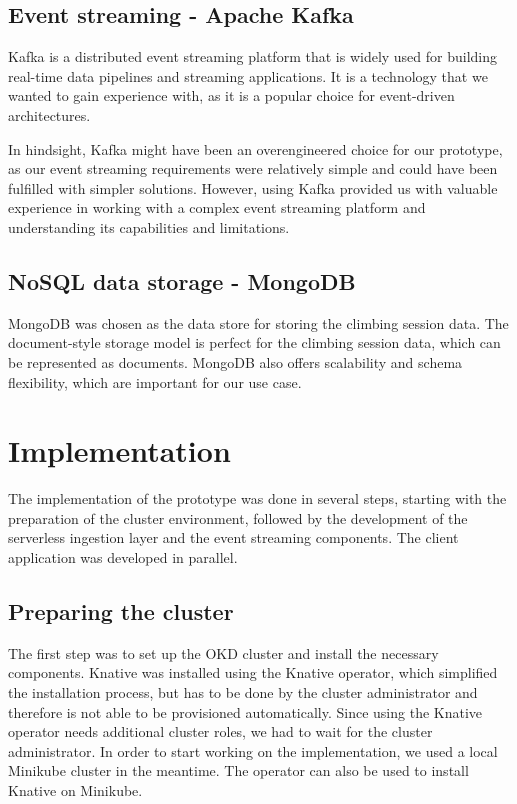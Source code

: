 \documentclass[12pt,a4paper,onecolumn,twoside]{tau-class/tau}
\begin{document}
\subsection{Event streaming - Apache Kafka}

Kafka is a distributed event streaming platform that is widely used for building real-time data pipelines and streaming applications. It is a technology that we wanted to gain experience with, as it is a popular choice for event-driven architectures.

In hindsight, Kafka might have been an overengineered choice for our prototype, as our event streaming requirements were relatively simple and could have been fulfilled with simpler solutions. However, using Kafka provided us with valuable experience in working with a complex event streaming platform and understanding its capabilities and limitations.

\subsection{NoSQL data storage - MongoDB}

MongoDB was chosen as the data store for storing the climbing session data. The document-style storage model is perfect for the climbing session data, which can be represented as documents. MongoDB also offers scalability and schema flexibility, which are important for our use case.


\section{Implementation}

The implementation of the prototype was done in several steps, starting with the preparation of the cluster environment, followed by the development of the serverless ingestion layer and the event streaming components. The client application was developed in parallel.

\subsection{Preparing the cluster}

The first step was to set up the OKD cluster and install the necessary components. Knative was installed using the Knative operator, which simplified the installation process, but has to be done by the cluster administrator and therefore is not able to be provisioned automatically. Since using the Knative operator needs additional cluster roles, we had to wait for the cluster administrator. In order to start working on the implementation, we used a local Minikube cluster in the meantime. The operator can also be used to install Knative on Minikube.
\end{document}
